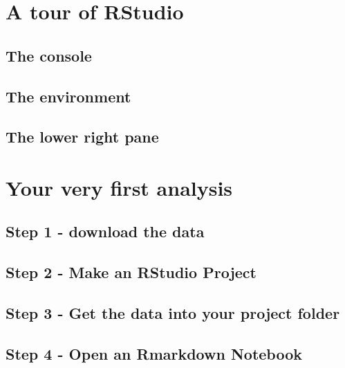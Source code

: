 \documentclass[
]{book}
\begin{document}
\hypertarget{a-tour-of-rstudio}{%
\section{A tour of RStudio}\label{a-tour-of-rstudio}}

\hypertarget{the-console}{%
\subsection{The console}\label{the-console}}

\hypertarget{the-environment}{%
\subsection{The environment}\label{the-environment}}

\hypertarget{the-lower-right-pane}{%
\subsection{The lower right pane}\label{the-lower-right-pane}}

\hypertarget{your-very-first-analysis}{%
\section{Your very first analysis}\label{your-very-first-analysis}}

\hypertarget{step-1---download-the-data}{%
\subsection{Step 1 - download the data}\label{step-1---download-the-data}}

\hypertarget{step-2---make-an-rstudio-project}{%
\subsection{Step 2 - Make an RStudio Project}\label{step-2---make-an-rstudio-project}}

\hypertarget{step-3---get-the-data-into-your-project-folder}{%
\subsection{Step 3 - Get the data into your project folder}\label{step-3---get-the-data-into-your-project-folder}}

\hypertarget{step-4---open-an-rmarkdown-notebook}{%
\subsection{Step 4 - Open an Rmarkdown Notebook}\label{step-4---open-an-rmarkdown-notebook}}
\end{document}

